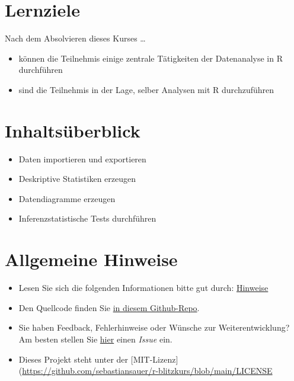 \documentclass[
]{book}
\providecommand{\tightlist}{%
  \setlength{\itemsep}{0pt}\setlength{\parskip}{0pt}}
\begin{document}
\hypertarget{lernziele}{%
\section{Lernziele}\label{lernziele}}

Nach dem Absolvieren dieses Kurses \ldots{}

\begin{itemize}
\tightlist
\item
  können die Teilnehmis einige zentrale Tätigkeiten der Datenanalyse in R durchführen
\item
  sind die Teilnehmis in der Lage, selber Analysen mit R durchzuführen
\end{itemize}

\hypertarget{inhaltsuxfcberblick}{%
\section{Inhaltsüberblick}\label{inhaltsuxfcberblick}}

\begin{itemize}
\tightlist
\item
  Daten importieren und exportieren
\item
  Deskriptive Statistiken erzeugen
\item
  Datendiagramme erzeugen
\item
  Inferenzstatistische Tests durchführen
\end{itemize}

\hypertarget{allgemeine-hinweise}{%
\section{Allgemeine Hinweise}\label{allgemeine-hinweise}}

\begin{itemize}
\item
  Lesen Sie sich die folgenden Informationen bitte gut durch: \href{https://sebastiansauer.github.io/fopra/Interna/Hinweise.html}{Hinweise}
\item
  Den Quellcode finden Sie \href{https://github.com/sebastiansauer/r-blitzkurs}{in diesem Github-Repo}.
\item
  Sie haben Feedback, Fehlerhinweise oder Wünsche zur Weiterentwicklung? Am besten stellen Sie \href{https://github.com/sebastiansauer/fopra/issues}{hier} einen \emph{Issue} ein.
\item
  Dieses Projekt steht unter der {[}MIT-Lizenz{]}(\url{https://github.com/sebastiansauer/r-blitzkurs/blob/main/LICENSE}
\end{itemize}
\end{document}
